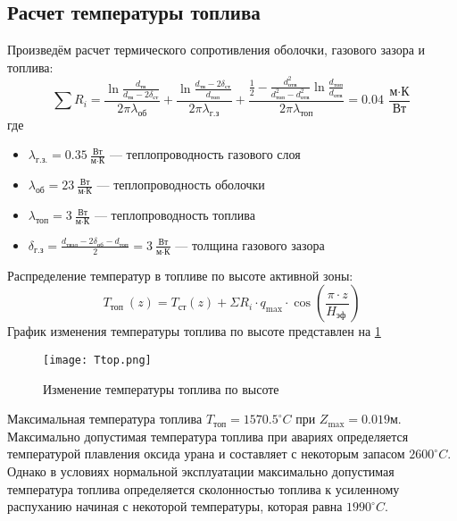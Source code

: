 \subsection{Расчет температуры топлива}
    Произведём расчет термического сопротивления оболочки, газового зазора и топлива:
$$
\sum R_i = 
\frac {\ln \frac {d_{\text{тв}}}{d_{\text{тв}} - 2\delta_{ст}}  }{2\pi\lambda_{\text{об}}}+\frac {\ln \frac {d_{\text{тв}} - 2\delta_{ст}}{d_{\text{топ}}}  }{2\pi\lambda_{\text{г.з}}}+\frac {\frac 1 2 - \frac {d_{\text{отв}}^2} {d_{\text{топ}}^2 - d_{\text{отв}}^2}\ln \frac {d_{\text{топ}}}{d_{\text{отв}}}} {2 \pi \lambda_{\text{топ}}} = 0.04\  \frac{\text{м} \cdot \text{К}}{\text{Вт}}
$$
где
\begin{itemize}
    \item $\lambda_{\text{г.з.}} = 0.35\  \frac {\text{Вт}}{\text{м} \cdot \text{К}}$ — теплопроводность газового слоя 
    \item $\lambda_{\text{об}} = 23\  \frac {\text{Вт}}{\text{м} \cdot \text{К}}$ — теплопроводность оболочки 
    \item $\lambda_{\text{топ}} = 3\  \frac {\text{Вт}}{\text{м} \cdot \text{К}}$ — теплопроводность топлива
    \item $\delta_{\text{г.з}} =\frac {d_{\text{твэл}} - 2\delta_{\text{об}} - d_{\text{топ}}}{2} =  3\  \frac {\text{Вт}}{\text{м} \cdot \text{К}}$ — толщина газового зазора 
\end{itemize}
Распределение температур в топливе по высоте активной зоны:
$$
T_{\text {топ }}(z)=T_{\mathrm{ст}}(z)+\Sigma R_{i} \cdot q_{\max } \cdot \cos \left(\frac{\pi \cdot z}{H_{\text {эф }}}\right)
$$
График изменения температуры топлива по высоте представлен на \ref{pic:top}
\begin{figure}[H]
	\begin{center}
		\texttt{[image: Ttop.png]}
		\caption{Изменение температуры топлива по высоте}
		\label{pic:top} %
	\end{center}
\end{figure}

Максимальная температура топлива $T_{\text{топ}} = 1570.5 ^\circ C$ при $Z_{\text{max}} = 0.019 \text{м}$. Максимально допустимая температура топлива при авариях определяется температурой плавления оксида урана и составляет с некоторым запасом $2600 ^\circ C$. Однако в условиях нормальной эксплуатации максимально допустимая температура топлива определяется сколонностью топлива к усиленному распуханию начиная с некоторой температуры, которая равна $1990 ^\circ C$.

